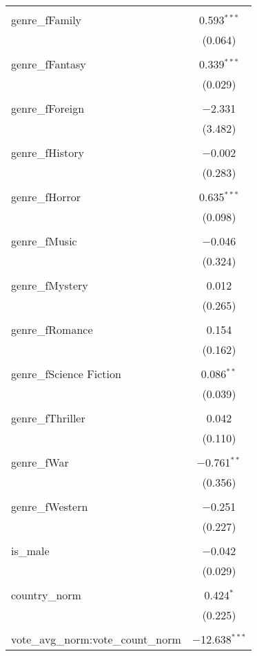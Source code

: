 \begin{table}[!htbp]
\begin{tabular}{@{\extracolsep{5pt}}lc}
  & \\ 
 genre\_fFamily & 0.593$^{***}$ \\ 
  & (0.064) \\ 
  & \\ 
 genre\_fFantasy & 0.339$^{***}$ \\ 
  & (0.029) \\ 
  & \\ 
 genre\_fForeign & $-$2.331 \\ 
  & (3.482) \\ 
  & \\ 
 genre\_fHistory & $-$0.002 \\ 
  & (0.283) \\ 
  & \\ 
 genre\_fHorror & 0.635$^{***}$ \\ 
  & (0.098) \\ 
  & \\ 
 genre\_fMusic & $-$0.046 \\ 
  & (0.324) \\ 
  & \\ 
 genre\_fMystery & 0.012 \\ 
  & (0.265) \\ 
  & \\ 
 genre\_fRomance & 0.154 \\ 
  & (0.162) \\ 
  & \\ 
 genre\_fScience Fiction & 0.086$^{**}$ \\ 
  & (0.039) \\ 
  & \\ 
 genre\_fThriller & 0.042 \\ 
  & (0.110) \\ 
  & \\ 
 genre\_fWar & $-$0.761$^{**}$ \\ 
  & (0.356) \\ 
  & \\ 
 genre\_fWestern & $-$0.251 \\ 
  & (0.227) \\ 
  & \\ 
 is\_male & $-$0.042 \\ 
  & (0.029) \\ 
  & \\ 
 country\_norm & 0.424$^{*}$ \\ 
  & (0.225) \\ 
  & \\ 
 vote\_avg\_norm:vote\_count\_norm & $-$12.638$^{***}$ \\ 

\end{tabular}
\end{table}
